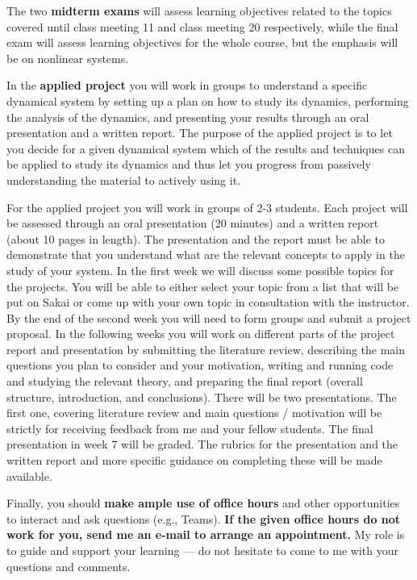 \documentclass[11pt]{article}
\begin{document}
The two \textbf{midterm exams} will assess learning objectives related to the topics covered until class meeting 11 and class meeting 20 respectively, while the final exam will assess learning objectives for the whole course, but the emphasis will be on nonlinear systems.

In the \textbf{applied project} you will work in groups to understand a specific dynamical system by setting up a plan on how to study its dynamics, performing the analysis of the dynamics, and presenting your results through an oral presentation and a written report. The purpose of the applied project is to let you decide for a given dynamical system which of the results and techniques can be applied to study its dynamics and thus let you progress from passively understanding the material to actively using it. 

For the applied project you will work in groups of 2-3 students. Each project will be assessed through an oral presentation (20 minutes) and a written report (about 10 pages in length). The presentation and the report must be able to demonstrate that you understand what are the relevant concepts to apply in the study of your system.  In the first week we will discuss some possible topics for the projects. You will be able to either select your topic from a list that will be put on Sakai or come up with your own topic in consultation with the instructor. By the end of the second week you will need to form groups and submit a project proposal. In the following weeks you will work on different parts of the project report and presentation by submitting the literature review, describing the main questions you plan to consider and your motivation, writing and running code and studying the relevant theory, and preparing the final report (overall structure, introduction, and conclusions). There will be two presentations. The first one, covering literature review and main questions / motivation will be strictly for receiving feedback from me and your fellow students. The final presentation in week 7 will be graded. The rubrics for the presentation and the written report and more specific guidance on completing these will be made available.

Finally, you should \textbf{make ample use of office hours} and other opportunities to interact and ask questions (e.g., Teams). \textbf{If the given office hours do not work for you, send me an e-mail to arrange an appointment.} My role is to guide and support your learning — do not hesitate to come to me with your questions and comments.
\end{document}
